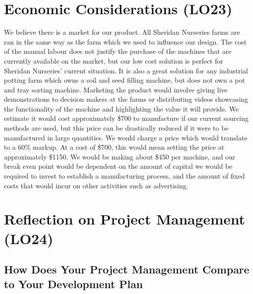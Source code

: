 \documentclass{article}
\begin{document}
\section{Economic Considerations (LO23)}


We believe there is a market for our product. All Sheridan Nurseries farms are ran in the same way 
as the farm which we used to influence our design. The cost of the manual labour does not justify the 
purchase of the machines that are currently available on the market, but our low cost solution is perfect 
for Sheridan Nurseries' current situation. It is also a great solution for any industrial potting farm which 
owns a soil and seed filling machine, but does not own a pot and tray sorting machine. Marketing the product 
would involve giving live demonstrations to decision makers at the farms or distributing videos showcasing the functionality 
of the machine and highlighting the value it will provide. We estimate it would cost approximately \$700 to manufacture 
if our current sourcing methods are used, but this price can be drastically reduced if it were to be manufactured in large 
quantities. We would charge a price which would translate to a 60\% markup. At a cost of \$700, this would mean setting the price 
at approximately \$1150. We would be making about \$450 per machine, and our break even point would be dependent on the amount of 
capital we would be required to invest to establish a manufacturing process, and the amount of fixed costs that would incur on other 
activities such as advertising.

\section{Reflection on Project Management (LO24)}



\subsection{How Does Your Project Management Compare to Your Development Plan}
\end{document}
